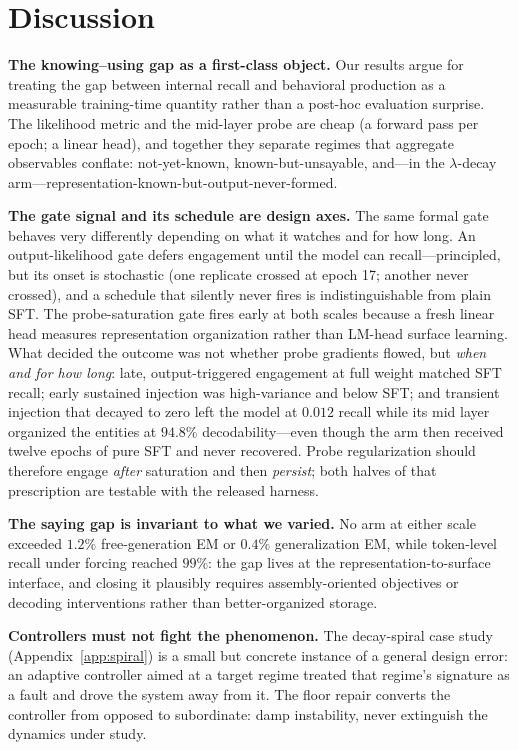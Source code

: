 \section{Discussion}
\label{sec:discussion}

\textbf{The knowing--using gap as a first-class object.} Our results
argue for treating the gap between internal recall and behavioral
production as a measurable training-time quantity rather than a
post-hoc evaluation surprise. The likelihood metric and the mid-layer
probe are cheap (a forward pass per epoch; a linear head), and together
they separate regimes that aggregate observables conflate:
not-yet-known, known-but-unsayable, and---in the $\lambda$-decay
arm---representation-known-but-output-never-formed.

\textbf{The gate signal and its schedule are design axes.} The same
formal gate behaves very differently depending on what it watches and
for how long. An output-likelihood gate defers engagement until the
model can recall---principled, but its onset is stochastic (one
replicate crossed at epoch 17; another never crossed), and a schedule
that silently never fires is indistinguishable from plain SFT. The
probe-saturation gate fires early at both scales because a fresh
linear head measures representation organization rather than LM-head
surface learning. What decided the outcome was not whether probe
gradients flowed, but \emph{when and for how long}: late,
output-triggered engagement at full weight matched SFT recall; early
sustained injection was high-variance and below SFT; and transient
injection that decayed to zero left the model at $0.012$ recall while
its mid layer organized the entities at $94.8\%$ decodability---even
though the arm then received twelve epochs of pure SFT and never
recovered. Probe regularization should therefore engage \emph{after}
saturation and then \emph{persist}; both halves of that prescription
are testable with the released harness.

\textbf{The saying gap is invariant to what we varied.} No arm at
either scale exceeded $1.2\%$ free-generation EM or $0.4\%$
generalization EM, while token-level recall under forcing reached
$99\%$: the gap lives at the representation-to-surface interface, and
closing it plausibly requires assembly-oriented objectives or decoding
interventions rather than better-organized storage.

\textbf{Controllers must not fight the phenomenon.} The decay-spiral
case study (Appendix~\ref{app:spiral}) is a small but concrete
instance of a general design error: an adaptive controller aimed at a
target regime treated that regime's signature as a fault and drove the
system away from it. The floor repair converts the controller from
opposed to subordinate: damp instability, never extinguish the
dynamics under study.

